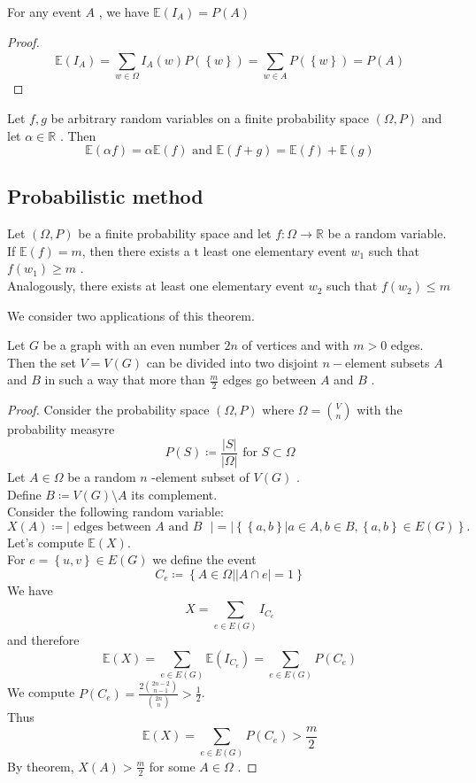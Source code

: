 \documentclass[../main.tex]{subfiles}
\begin{document}
\begin{lemma}
	For any event $A$ , we have $\mathbb{E}( I_A) = P( A) $ 
\end{lemma}
\begin{proof}
\[ 
	\mathbb{E}( I_A) = \sum_{w \in \Omega}^{ }I_A( w) P( \left\{ w \right\} ) = \sum_{w \in A}^{ }P( \left\{ w \right\} ) = P( A) 
\]

\end{proof}
\begin{thm}
	Let $f,g$ be arbitrary random variables on a finite probability space $ ( \Omega, P) $ and let $\alpha \in \mathbb{R}$ . Then
	\[ 
		\mathbb{E}( \alpha f) = \alpha \mathbb{E}( f) \text{ and } \mathbb{E}( f+g)= \mathbb{E}( f) + \mathbb{E}( g) 
	\]
\end{thm}
\subsection{Probabilistic method}
\begin{thm}
	Let $(  \Omega, P) $ be a finite probability space and let $f: \Omega \to \mathbb{R}$ be a random variable.\\
	If $\mathbb{E}( f) = m$, then there exists a t least one elementary event $w_1$ such that $f( w_1) \geq m$ .\\
	Analogously, there exists at least one elementary event $w_2$ such that $f( w_2) \leq m$ 
\end{thm}
We consider two applications of this theorem.
\begin{thm}
Let $G$ be a graph with an even number $2n$ of vertices and with $m>0$ edges.\\
Then the set $V= V( G) $ can be divided into two disjoint $n-$element subsets $A$ and $B$ in such a way that more than $\frac{m}{2}$ edges go between $A$ and $B$ .
\end{thm}
\begin{proof}
	Consider the probability space $( \Omega, P) $ where $\Omega = \binom V n$  with the probability measyre
	\[ 
		P( S) \coloneqq  \frac{|S|}{| \Omega|} \text{ for } S \subset \Omega
	\]
	Let $A \in \Omega$ be a random $n$ -element subset of $V( G)$ .\\
	Define $B \coloneqq V( G) \setminus A$ its complement.\\
	Consider the following random variable:
	\[ 
		X( A) \coloneqq | \text{ edges between $A$ and $B$  } | = | \left\{ \left\{ a,b \right\} | a \in A, b \in B, \left\{ a,b \right\} \in E( G)  \right\} .	
	\]
	Let's compute $ \mathbb{E}(X)$.\\
	For $e = \left\{ u,v \right\}  \in E( G) $ we define the event
	\[ 
	C_e \coloneqq \left\{ A \in \Omega | |A\cap e| =1 \right\} 		
	\]
	We have 
	\[ 
		X = \sum_{e \in E( G) }^{ }I_{C_e} 
	\]
	and therefore
	\[ 
		\mathbb{E}( X) = \sum_{e \in E( G) }^{ } \mathbb{E}( I_{C_e} ) = \sum_{e \in E( G) }^{ }P( C_e) 
	\]
	We compute $P( C_{e} ) = \frac{2 \binom { 2n-2} { n-1} }{ \binom { 2n} n}> \frac{1}{2}$.\\
	Thus 
	\[ 
		\mathbb{E}( X) = \sum_{e \in E( G) }^{ }P( C_e) > \frac{m}{2}
	\]
	By theorem, $X( A) > \frac{m}{2}$ for some $A \in \Omega$ .
	
\end{proof}
\end{document}
